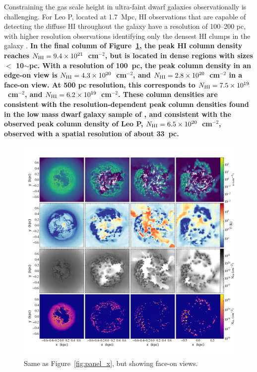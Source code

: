\documentclass[fleqn,usenatbib,useAMS]{mnras}
\begin{document}
Constraining the gas scale height in ultra-faint dwarf galaxies observationally is challenging. For Leo P, located at 1.7~Mpc, HI observations that are capable of detecting the diffuse HI throughout the galaxy have a resolution of 100--200 pc, with higher resolution observations identifying only the densest HI clumps in the galaxy \citep[e.g.][]{Bernstein-Cooper2014}. \textbf{In the final column of Figure~\ref{fig:panel_z}, the peak HI column density reaches $N_{\rm HI} = 9.4 \times 10^{21}$~cm$^{-2}$, but is located in dense regions with sizes $<$ 10$\sim$pc. With a resolution of 100~pc, the peak column density in an edge-on view is $N_{\rm HI} = 4.3 \times 10^{20}$~cm$^{-2}$, and $N_{\rm HI} = 2.8 \times 10^{20}$~cm$^{-2}$ in a face-on view. At 500 pc resolution, this corresponds to $N_{\rm HI} = 7.5 \times 10^{19}$~cm$^{-2}$, and $N_{\rm HI} = 6.2 \times 10^{19}$~cm$^{-2}$. These column densities are consistent with the resolution-dependent peak column densities found in the low mass dwarf galaxy sample of \cite{Teich2016}, and consistent with the observed peak column density of Leo P, $N_{\rm HI} = 6.5 \times 10^{20}$~cm$^{-2}$, observed with a spatial resolution of about 33~pc.}

\begin{figure}
\centering
\includegraphics[width=0.975\linewidth]{multiplot_4x4_z.png}
\caption{Same as Figure~\ref{fig:panel_x}, but showing face-on views.}
\label{fig:panel_z}
\end{figure}
\end{document}
